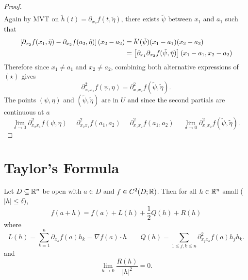 \documentclass[../main.tex]{subfiles}
\begin{document}
\begin{proof}
\begin{align*}
    \end{align*}
    Again by MVT on $\tilde{h}(t) = \partial_{x_2} f(t, \tilde{\eta})$, there exists $\tilde{\psi}$ between $x_1$ and $a_1$ such that
    \begin{align*}
        \qty[\partial_{x_2} f(x_1, \tilde{\eta}) - \partial_{x_2} f(a_2, \tilde{\eta})] (x_2 - a_2) &= \tilde{h}'(\tilde{\psi}) (x_1 - a_1) (x_2 - a_2) \\
                                                                                                    &= \qty[\partial_{x_1} \partial_{x_2} f(\tilde{\psi}, \tilde{\eta})] (x_1 - a_1, x_2 - a_2)
    \end{align*}
    Therefore since $x_1 \neq a_1$ and $x_2 \neq a_2$, combining both alternative expressions of $(\star)$ gives
    \[
        \partial^2_{x_2 x_1} f(\psi, \eta) = \partial^2_{x_1 x_2} f(\tilde{\psi}, \tilde{\eta})
    .\]
    The points $(\psi, \eta)$ and $(\tilde{\psi}, \tilde{\eta})$ are in $U$ and since the second partials are continuous at $a$
    \[
        \lim_{\delta \to 0} \partial^2_{x_2 x_1} f(\psi, \eta) = \partial^2_{x_2 x_1} f(a_1, a_2) = \partial^2_{x_1 x_2} f(a_1, a_2) = \lim_{\delta \to 0} \partial^2_{x_1 x_2} f(\tilde{\psi}, \tilde{\eta})
    .\]
\end{proof}

\section{Taylor's Formula}

\begin{theorem}
    \label{thm:taylorformula}
    Let $D \subseteq \mathbb{R}^n$ be open with $a \in D$ and $f \in C^2(D; \mathbb{R})$. Then for all $h \in \mathbb{R}^n$ small ($|h| \leq \delta$),
    \[
        f(a+h) = f(a) + L(h) + \frac{1}{2} Q(h) + R(h)
    \]
    where
    \[
        L(h) = \sum_{k=1}^n \partial_{x_k} f(a) h_k = \nabla f(a) \cdot h \hspace{2em}
        Q(h) = \sum_{1 \leq j,k \leq n} \partial^2_{x_j x_k} f(a) h_j h_k
    .\]
    and
    \[
        \lim_{h \to 0} \frac{R(h)}{|h|^2} = 0
    .\]
\end{theorem}
\end{document}
